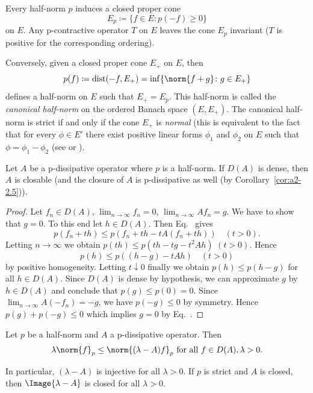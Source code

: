 \begin{remark}\label{rem:a2-2.8}
Every half-norm $p$ induces a closed proper cone 
\[
E_{p} \coloneqq \{f \in E \colon p(-f) \geq 0\}
\] 
on $E$.
Any p-contractive operator $T$ on $E$ leaves the cone $E_{p}$ invariant (\ie  $T$ is positive for the corresponding ordering).

Conversely, given a closed proper cone $E_{+}$ on $E$, then 
\[
p(f) \coloneqq \text{dist}(-f,E_{+}) = \inf\{\norm{f + g} \colon g \in E_{+}\}
\]
defines a half-norm on $E$ such that $E_{+} = E_{p}$.
This half-norm is called the \emph{canonical half-norm} on the ordered Banach space $(E,E_{+})$.
The canonical half-norm is strict if and only if the cone $E_{+}$ is \emph{normal} (this is equivalent to the fact that for every $\phi \in E'$ there exist positive linear forms $\phi_{1}$ and $\phi_{2}$ on $E$ such that $\phi = \phi_{1} - \phi_{2}$ (see \textcite{battyrobinson:1984} or \textcite[Chapter V]{schaefer:1966}).
\end{remark}
\begin{proposition}\label{prop:a2-2.9}
Let $A$ be a p-dissipative operator where $p$ is a half-norm.
If\/ $D(A)$ is dense, then $A$ is closable (and the closure of\/ $A$ is p-dissipative as well (by Corollary~\ref{cor:a2-2.5})). 
\end{proposition}

\begin{proof}
Let $f_n \in D(A)$, $\lim_{n \to \infty} f_{n} = 0$, $\lim_{n \to \infty} Af_{n} = g$.
We have to show that $g = 0$.
To this end let $h \in D(A)$.
Then Eq.~   
gives 
%	
\[
p(f_{n} + th) \leq p(f_{n} + th - tA(f_{n} + th)) \quad (t > 0) .
\]
%
Letting $n \to \infty$ we obtain 
$p(th) \leq p(th - tg - t^{2}Ah)$ \quad $(t > 0)$.
Hence 
\[
p(h) \leq p((h-g) - tAh) \quad (t > 0)
\] 
by positive homogeneity.
Letting $t \downarrow 0$ finally we obtain $p(h) \leq p(h - g)$ for all $h \in D(A)$.
Since $D(A)$ is dense by hypothesis, we can approximate $g$ by $h \in D(A)$ and conclude that $p(g) \leq p(0) = 0$.
Since $\lim_{n\to\infty} A(-f_{n}) = -g$, we have $p(-g) \leq 0$ by symmetry.
Hence $p(g) + p(-g) \leq 0$ which implies $g = 0$ by Eq.~. 
\end{proof}

\begin{lemma}\label{lem:a2-2.10}
Let $p$ be a half-norm and $A$ a p-dissipative operator.
Then
\begin{equation}\label{eq:a2-2.14}
\lambda\norm{f}_{p} \leq \norm{(\lambda - A)f}_{p} \text{ for all } f \in D(A), \lambda > 0.
\end{equation}

In particular, $(\lambda-A)$ is injective for all $\lambda > 0$.
If\/ $p$ is strict and $A$ is closed, then $\Image{\lambda - A}$ is closed for all $\lambda > 0$.
\end{lemma}

